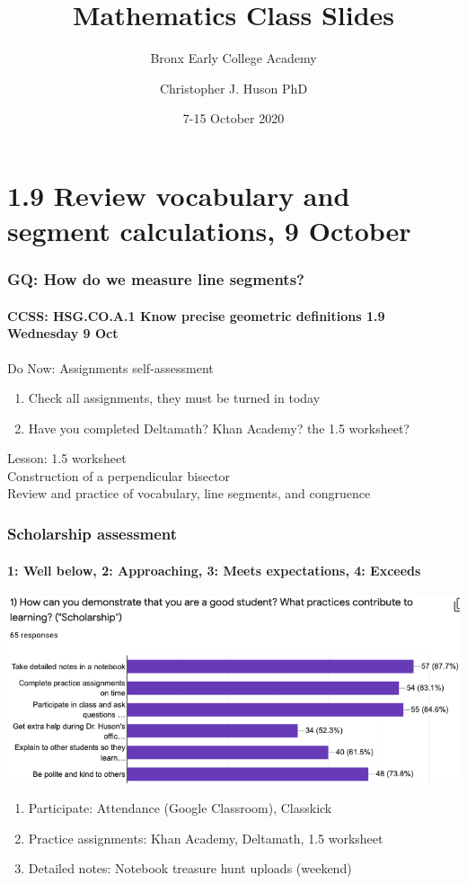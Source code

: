 \documentclass{beamer}
\title{Mathematics Class Slides}
\subtitle{Bronx Early College Academy}
\author{Christopher J. Huson PhD}
\date{7-15 October 2020}
\begin{document}
\frame{\titlepage}
\section[Outline]{}
\frame{\tableofcontents}

\section{1.9 Review vocabulary and segment calculations, 9 October}
  \frame
  {
    \frametitle{GQ: How do we measure line segments?}
    \framesubtitle{CCSS: HSG.CO.A.1 Know precise geometric definitions  \hfill \alert{1.9 Wednesday 9 Oct}}
  
    \begin{block}{Do Now: Assignments self-assessment}
    \begin{enumerate}
        \item Check all assignments, they must be turned in today
        \item Have you completed Deltamath? Khan Academy? the 1.5 worksheet?
    \end{enumerate}
    \end{block}
    Lesson: 1.5 worksheet\\
    Construction of a perpendicular bisector \\
    Review and practice of vocabulary, line segments, and congruence
  }

  \frame
  {
    \frametitle{Scholarship assessment}
    \framesubtitle{1: Well below, 2: Approaching, 3: Meets expectations, 4: Exceeds}
  \includegraphics[width=.95\textwidth]{scholarship-bar-chart.png}
    \begin{enumerate}
      \item Participate: Attendance (Google Classroom), Classkick
      \item Practice assignments: Khan Academy, Deltamath, 1.5 worksheet
      \item Detailed notes: Notebook treasure hunt uploads (weekend)
    \end{enumerate}
  }
\end{document}
